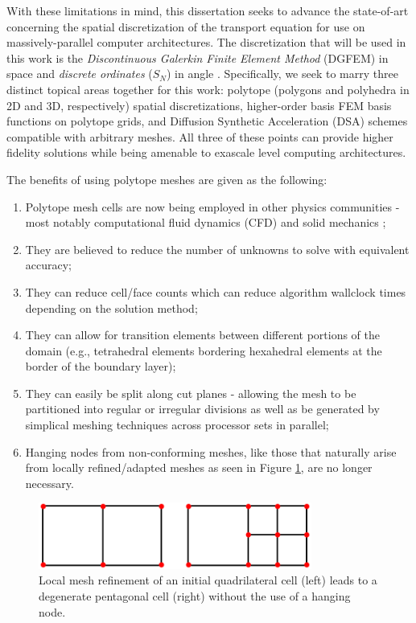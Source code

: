 With these limitations in mind, this dissertation seeks to advance the state-of-art concerning the spatial discretization of the transport equation for use on massively-parallel computer architectures. The discretization that will be used in this work is the {\em Discontinuous Galerkin Finite Element Method} (DGFEM) in space and {\em discrete ordinates} ($S_N$) in angle \cite{johnson1984finite,morel2005s}. Specifically, we seek to marry three distinct topical areas together for this work: polytope (polygons and polyhedra in 2D and 3D, respectively) spatial discretizations, higher-order basis FEM basis functions on polytope grids, and Diffusion Synthetic Acceleration (DSA) schemes compatible with arbitrary meshes. All three of these points can provide higher fidelity solutions while being amenable to exascale level computing architectures.

The benefits of using polytope meshes are given as the following:

\begin{enumerate}
	\item Polytope mesh cells are now being employed in other physics communities - most notably computational fluid dynamics (CFD) \cite{ref::star_CCM} and solid mechanics \cite{yip2005automated};
	\item They are believed to reduce the number of unknowns to solve with equivalent accuracy;
	\item They can reduce cell/face counts which can reduce algorithm wallclock times depending on the solution method;
	\item They can allow for transition elements between different portions of the domain (e.g., tetrahedral elements bordering hexahedral elements at the border of the boundary layer);
	\item They can easily be split along cut planes - allowing the mesh to be partitioned into regular or irregular divisions as well as be generated by simplical meshing techniques across processor sets in parallel;
	\item Hanging nodes from non-conforming meshes, like those that naturally arise from locally refined/adapted meshes as seen in Figure \ref{fig::Intro_locally_refined_vertices}, are no longer necessary. 
\end{enumerate}

\begin{figure}
\centering
\includegraphics[width=0.80\textwidth]{figures/sec_Intro/locally_refined_vertices.png}
\caption{Local mesh refinement of an initial quadrilateral cell (left) leads to a degenerate pentagonal cell (right) without the use of a hanging node.}
\label{fig::Intro_locally_refined_vertices}
\end{figure}

